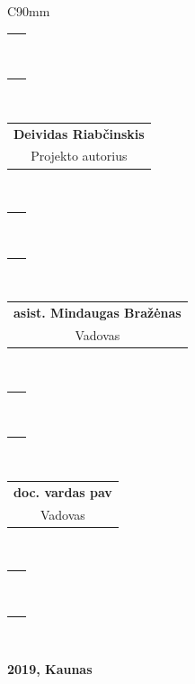 \begin{titlepage}
\begin{center}
     \singlespacing
     \begin{table}[H]
       \centering
      \begin{tabular}{C{90mm}}
      \hline
      \begin{tabular}{@{}c@{}}~\\~\end{tabular} \\
      \begin{tabular}{@{}c@{}}\textbf{Deividas Riabčinskis}\\Projekto autorius\end{tabular} \\
      \begin{tabular}{@{}c@{}}~\\~\end{tabular} \\
      \begin{tabular}{@{}c@{}}\textbf{asist. Mindaugas Bražėnas}\\Vadovas\end{tabular} \\
        \begin{tabular}{@{}c@{}}~\\~\end{tabular} \\
        \begin{tabular}{@{}c@{}}\textbf{doc. vardas pav}\\Vadovas\end{tabular} \\
      \begin{tabular}{@{}c@{}}~\\~\end{tabular} \\ \hline
      \end{tabular}
    \end{table}

\onehalfspacing

     \vfill

     \textbf{2019, Kaunas}

   \end{center}
\end{titlepage}
